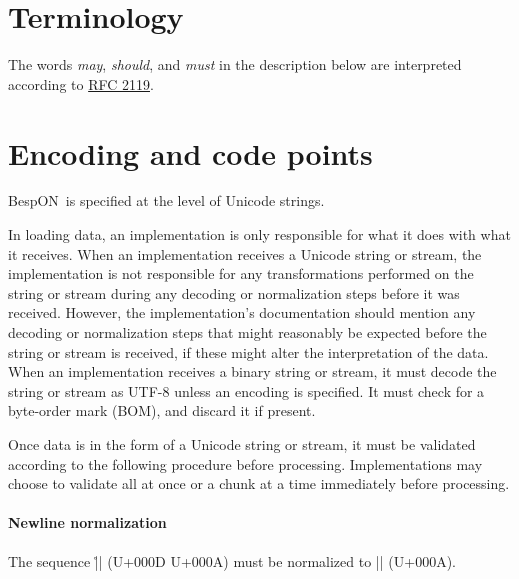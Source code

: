 \documentclass[11pt]{article}
\newcommand{\bespon}{BespON}
\begin{document}
\section{Terminology}

The words \textit{may}, \textit{should}, and \textit{must} in the description below are interpreted according to \href{http://www.ietf.org/rfc/rfc2119.txt}{RFC 2119}.




\section{Encoding and code points}

\bespon\ is specified at the level of Unicode strings.

In loading data, an implementation is only responsible for what it does with what it receives.  When an implementation receives a Unicode string or stream, the implementation is not responsible for any transformations performed on the string or stream during any decoding or normalization steps before it was received.  However, the implementation's documentation should mention any decoding or normalization steps that might reasonably be expected before the string or stream is received, if these might alter the interpretation of the data.  When an implementation receives a binary string or stream, it must decode the string or stream as UTF-8 unless an encoding is specified.  It must check for a byte-order mark (BOM), and discard it if present.

Once data is in the form of a Unicode string or stream, it must be validated according to the following procedure before processing.  Implementations may choose to validate all at once or a chunk at a time immediately before processing.

\paragraph{Newline normalization}  The sequence |\r\n| (U+000D U+000A) must be normalized to |\n| (U+000A).  
\end{document}
